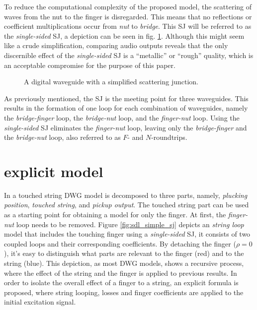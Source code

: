 \documentclass{sigchi}
\begin{document}
To reduce the computational complexity of the proposed model, the scattering of waves from the nut to the finger is disregarded.
This means that no reflections or coefficient multiplications occur from \textit{nut} to \textit{bridge}.
This SJ will be referred to as the \textit{single-sided} SJ, a depiction can be seen in fig. \ref{fig:waveguide_simple_sj}.
Although this might seem like a crude simplification, comparing audio outputs reveals that the only discernible effect of the \textit{single-sided} SJ is a ``metallic'' or ``rough'' quality, which is an acceptable compromise for the purpose of this paper.
\begin{figure}[h]
	\centering
	\scalebox{0.6}{}
	\caption{A digital waveguide with a simplified scattering junction.}
	\label{fig:waveguide_simple_sj}
\end{figure}

As previously mentioned, the SJ is the meeting point for three waveguides.
This results in the formation of one loop for each combination of waveguides, namely the \textit{bridge-finger} loop, the \textit{bridge-nut} loop, and the \textit{finger-nut} loop.
Using the \textit{single-sided} SJ eliminates the \textit{finger-nut} loop, leaving only the \textit{bridge-finger} and the \textit{bridge-nut} loop, also referred to as $F$- and $N$-roundtrips.

\section{explicit model}
In \cite{pakarinen_physical_2005} a touched string DWG model is decomposed to three parts, namely, \textit{plucking position}, \textit{touched string}, and \textit{pickup output}.
The touched string part can be used as a starting point for obtaining a model for only the finger.
At first, the \textit{finger-nut} loop needs to be removed. Figure \ref{fig:sdl_simple_sj} depicts an \textit{string loop} model that includes the touching finger using a \textit{single-sided} SJ, it consists of two coupled loops and their corresponding coefficients.
By detaching the finger ($\rho = 0$), it's easy to distinguish what parts are relevant to the finger (red) and to the string (blue).
This depiction, as most DWG models, shows a recursive process, where the effect of the string and the finger is applied to previous results.
In order to isolate the overall effect of a finger to a string, an explicit formula is proposed, where
string looping, losses and finger coefficients are applied to the initial excitation signal.
\end{document}
